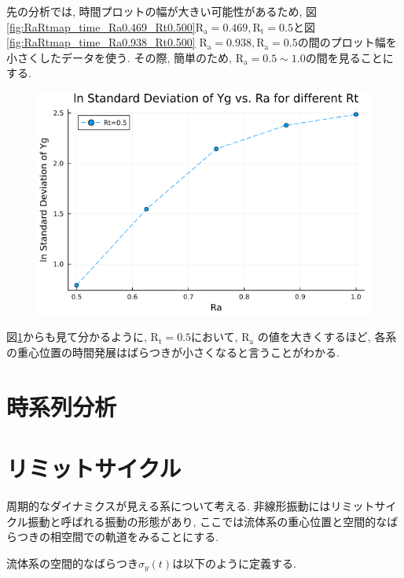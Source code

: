 先の分析では, 時間プロットの幅が大きい可能性があるため, 図\ref{fig:RaRtmap_time_Ra0.469_Rt0.500}$\text{R}_\text{a} = 0.469, \text{R}_\text{t} = 0.5$と図\ref{fig:RaRtmap_time_Ra0.938_Rt0.500} $\text{R}_\text{a} = 0.938, \text{R}_\text{a} = 0.5$の間のプロット幅を小さくしたデータを使う. その際, 簡単のため, $\text{R}_\text{a} =0.5 \sim 1.0$の間を見ることにする.



\begin{figure}[H]
  \centering
  \includegraphics[scale=0.5]{image/lnStdYg_Ra0.5to1.0_Rt0.5_ti25000.png}
  \caption{}
  \label{fig:lnStdYg_Ra0.5to1.0_Rt0.5_ti25000}
\end{figure}

図\ref{fig:lnStdYg_Ra0.5to1.0_Rt0.5_ti25000}からも見て分かるように, $\text{R}_\text{t} = 0.5$において, $\text{R}_\text{a}$ の値を大きくするほど, 各系の重心位置の時間発展はばらつきが小さくなると言うことがわかる.


\section{時系列分析}


\section{リミットサイクル}

周期的なダイナミクスが見える系について考える. 非線形振動にはリミットサイクル振動\cite{Rhythm}と呼ばれる振動の形態があり, ここでは流体系の重心位置と空間的なばらつきの相空間での軌道をみることにする.

流体系の空間的なばらつき$\sigma_{y} (t)$は以下のように定義する.

